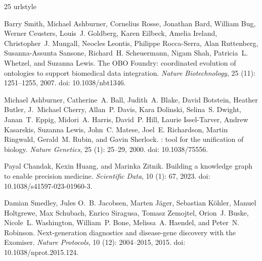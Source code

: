 \documentclass[10pt]{article}
\theoremstyle{accentdef}
\begin{document}

\begin{thebibliography}{25}
\providecommand{\natexlab}[1]{#1}
\providecommand{\url}[1]{\texttt{#1}}
\expandafter\ifx\csname urlstyle\endcsname\relax
  \providecommand{\doi}[1]{doi: #1}\else
  \providecommand{\doi}{doi: \begingroup \urlstyle{rm}\Url}\fi

Barry Smith, Michael Ashburner, Cornelius Rosse, Jonathan Bard, William Bug,
  Werner Ceusters, Louis~J. Goldberg, Karen Eilbeck, Amelia Ireland,
  Christopher~J. Mungall, Neocles Leontis, Philippe Rocca-Serra, Alan
  Ruttenberg, Susanna-Assunta Sansone, Richard~H. Scheuermann, Nigam Shah,
  Patricia~L. Whetzel, and Suzanna Lewis.
\newblock The {OBO Foundry}: coordinated evolution of ontologies to support
  biomedical data integration.
\newblock \emph{Nature Biotechnology}, 25 (11): 1251--1255,
  2007.
\newblock \doi{10.1038/nbt1346}.

Michael Ashburner, Catherine~A. Ball, Judith~A. Blake, David Botstein, Heather
  Butler, J.~Michael Cherry, Allan~P. Davis, Kara Dolinski, Selina~S. Dwight,
  Janan~T. Eppig, Midori~A. Harris, David~P. Hill, Laurie Issel-Tarver, Andrew
  Kasarskis, Suzanna Lewis, John~C. Matese, Joel~E. Richardson, Martin
  Ringwald, Gerald~M. Rubin, and Gavin Sherlock.
: tool for the unification of biology.
\newblock \emph{Nature Genetics}, 25 (1): 25--29, 2000.
\newblock \doi{10.1038/75556}.

Payal Chandak, Kexin Huang, and Marinka Zitnik.
\newblock Building a knowledge graph to enable precision medicine.
\newblock \emph{Scientific Data}, 10 (1): 67, 2023.
\newblock \doi{10.1038/s41597-023-01960-3}.

Damian Smedley, Jules O.~B. Jacobsen, Marten J{\"a}ger, Sebastian K{\"o}hler,
  Manuel Holtgrewe, Max Schubach, Enrico Siragusa, Tomasz Zemojtel, Orion~J.
  Buske, Nicole~L. Washington, William~P. Bone, Melissa~A. Haendel, and
  Peter~N. Robinson.
\newblock Next-generation diagnostics and disease-gene discovery with the
  {Exomiser}.
\newblock \emph{Nature Protocols}, 10 (12): 2004--2015, 2015.
\newblock \doi{10.1038/nprot.2015.124}.


\end{thebibliography}
\end{document}
